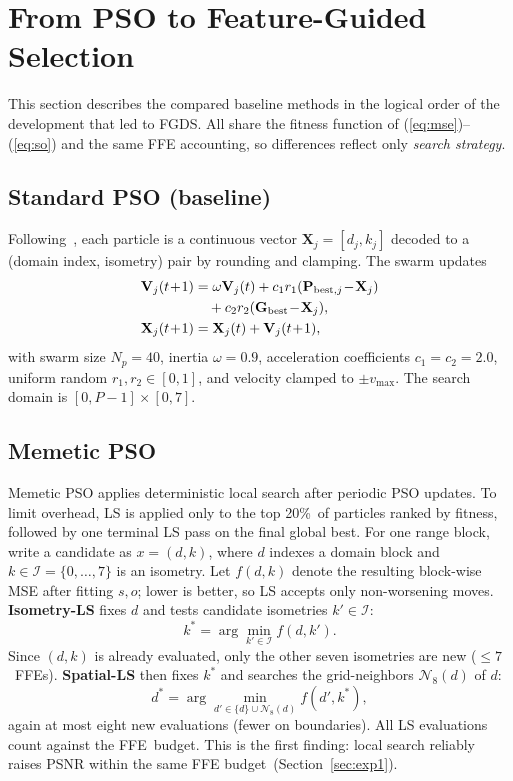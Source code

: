\documentclass[conference, a4paper]{IEEEtran}
\begin{document}
\section{From PSO to Feature-Guided Selection}
\label{sec:baselines}

This section describes the compared baseline methods in the logical order of the development that led to FGDS. All share the fitness function of (\ref{eq:mse})--(\ref{eq:so}) and the same FFE accounting, so differences reflect only \emph{search strategy}.

\subsection{Standard PSO (baseline)}
Following~\cite{PSOFIC}, each particle is a continuous vector \mbox{$\mathbf{X}_j=[d_j,k_j]$} decoded to a (domain index, isometry) pair by rounding and clamping. The swarm updates
\begin{align}
    \mathbf{V}_j(t\!+\!1) & = \omega\mathbf{V}_j(t) + c_1 r_1(\mathbf{P}_{\text{best},j}\!-\!\mathbf{X}_j) \notag\\
    &\quad + c_2 r_2(\mathbf{G}_{\text{best}}\!-\!\mathbf{X}_j), \\
    \mathbf{X}_j(t\!+\!1) & = \mathbf{X}_j(t) + \mathbf{V}_j(t\!+\!1),
\end{align}
with swarm size \mbox{$N_p\!=\!40$}, inertia \mbox{$\omega\!=\!0.9$}, acceleration coefficients \mbox{$c_1\!=\!c_2\!=\!2.0$}, uniform random \mbox{$r_1,r_2\in[0,1]$}, and velocity clamped to \mbox{$\pm v_{\max}$}. The search domain is \mbox{$[0,P\!-\!1]\times[0,7]$}.

\subsection{Memetic PSO}
Memetic PSO applies deterministic local search after periodic PSO updates. To limit overhead, LS is applied only to the top 20\%~of particles ranked by fitness, followed by one terminal LS pass on the final global best. For one range block, write a candidate as \mbox{$x=(d,k)$}, where \mbox{$d$} indexes a domain block and \mbox{$k\in\mathcal{I}=\{0,\ldots,7\}$} is an isometry. Let \mbox{$f(d,k)$} denote the resulting block-wise MSE after fitting \mbox{$s,o$}; lower is better, so LS accepts only non-worsening moves. \textbf{Isometry-LS} fixes \mbox{$d$} and tests candidate isometries \mbox{$k'\in\mathcal{I}$}:
\begin{equation}
    k^*=\arg\min_{k'\in\mathcal{I}} f(d,k').
    \label{eq:isometry_ls}
\end{equation}
Since \mbox{$(d,k)$} is already evaluated, only the other seven isometries are new (\mbox{$\le7$}~FFEs). \textbf{Spatial-LS} then fixes \mbox{$k^*$} and searches the grid-neighbors \mbox{$\mathcal{N}_8(d)$} of \mbox{$d$}:
\begin{equation}
    d^*=\arg\min_{d'\in\{d\}\cup\mathcal{N}_8(d)} f(d',k^*),
    \label{eq:spatial_ls}
\end{equation}
again at most eight new evaluations (fewer on boundaries). All LS evaluations count against the FFE~budget. This is the first finding: local search reliably raises PSNR within the same FFE budget~(Section~\ref{sec:exp1}).
\end{document}
